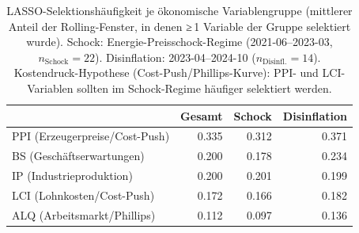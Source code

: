 \begin{table}
\caption{LASSO-Selektionshäufigkeit je ökonomische Variablengruppe (mittlerer Anteil der Rolling-Fenster, in denen ≥\,1 Variable der Gruppe selektiert wurde). Schock: Energie-Preisschock-Regime (2021-06--2023-03, $n_{\text{Schock}}=22$). Disinflation: 2023-04--2024-10 ($n_{\text{Disinfl.}}=14$). Kostendruck-Hypothese (Cost-Push/Phillips-Kurve): PPI- und LCI-Variablen sollten im Schock-Regime häufiger selektiert werden.}
\label{tab:selection_economic}
\begin{tabular}{lrrr}
\toprule
 & Gesamt & Schock & Disinflation \\
\midrule
PPI (Erzeugerpreise/Cost-Push) & 0.335 & 0.312 & 0.371 \\
BS (Geschäftserwartungen) & 0.200 & 0.178 & 0.234 \\
IP (Industrieproduktion) & 0.200 & 0.201 & 0.199 \\
LCI (Lohnkosten/Cost-Push) & 0.172 & 0.166 & 0.182 \\
ALQ (Arbeitsmarkt/Phillips) & 0.112 & 0.097 & 0.136 \\
\bottomrule
\end{tabular}
\end{table}
